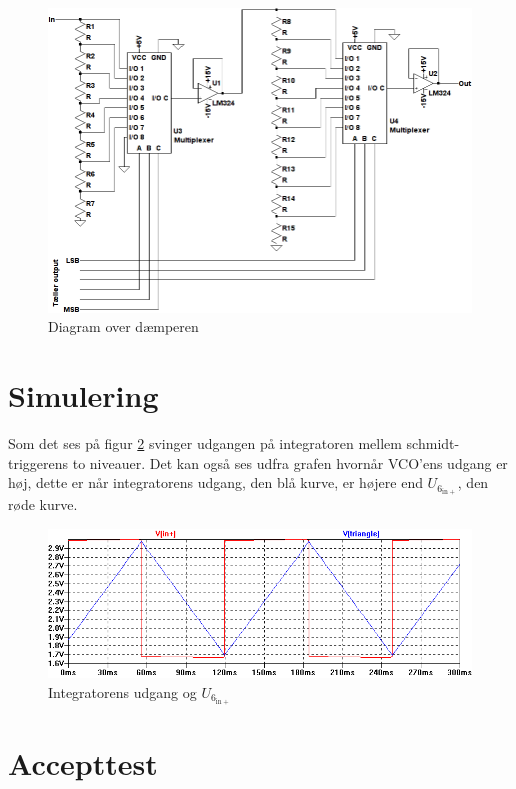 \begin{figure}[h]
\centering
\includegraphics[width=\textwidth]{teknisk/volumenkontrol/daemper.png}
\caption{Diagram over dæmperen}
\label{fig:volumenkontrol_daemper}
\end{figure}

\section{Simulering}
\label{volumenkontrol-simulering}

Som det ses på figur \ref{fig:vco-signal} svinger udgangen på integratoren mellem schmidt-triggerens to niveauer. Det kan også ses udfra grafen hvornår VCO'ens udgang er høj, dette er når integratorens udgang, den blå kurve, er højere end $U_{6_{\mathrm{in+}}}$, den røde kurve.

\begin{figure}[h]
\centering
\includegraphics[width=\textwidth]{teknisk/volumenkontrol/vco-signal.png}
\caption{Integratorens udgang og $U_{6_{\mathrm{in+}}}$}
\label{fig:vco-signal}
\end{figure}

\section{Accepttest}
\label{volumenkontrol-accepttest}

